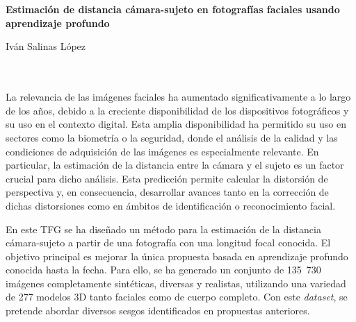 \chapter*{}
\thispagestyle{empty}


\vspace*{-3cm}

\begin{center}
{\large\bfseries Estimación de distancia cámara-sujeto en fotografías faciales usando aprendizaje profundo}\\
\end{center}
\begin{center}
Iván Salinas López\\
\end{center}

\\

\vspace{0.7cm}
\\

La relevancia de las imágenes faciales ha aumentado significativamente a lo largo de los años, debido a la creciente disponibilidad de los dispositivos fotográficos y su uso en el contexto digital. Esta amplia disponibilidad ha permitido su uso en sectores como la biometría o la seguridad, donde el análisis de la calidad y las condiciones de adquisición de las imágenes es especialmente relevante. En particular, la estimación de la distancia entre la cámara y el sujeto es un factor crucial para dicho análisis. Esta predicción permite calcular la distorsión de perspectiva y, en consecuencia, desarrollar avances tanto en la corrección de dichas distorsiones como en ámbitos de identificación o reconocimiento facial.

En este TFG se ha diseñado un método para la estimación de la distancia cámara-sujeto a partir de una fotografía con una longitud focal conocida. El objetivo principal es mejorar la única propuesta basada en aprendizaje profundo conocida hasta la fecha. Para ello, se ha generado un conjunto de 135~730 imágenes completamente sintéticas, diversas y realistas, utilizando una variedad de 277 modelos 3D tanto faciales como de cuerpo completo. Con este \textit{dataset}, se pretende abordar diversos sesgos identificados en propuestas anteriores.

